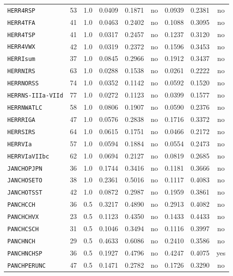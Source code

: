 \begin{landscape}
\begin{longtable}{@{}p{2.9cm}r r r r c r r c@{}}
\texttt{HERR4RSP} & 53 & 1.0 & 0.0409 & 0.1871 & no & 0.0939 & 0.2381 & no \\
\texttt{HERR4TFA} & 41 & 1.0 & 0.0463 & 0.2402 & no & 0.1088 & 0.3095 & no \\
\texttt{HERR4TSP} & 41 & 1.0 & 0.0317 & 0.2457 & no & 0.1237 & 0.3120 & no \\
\texttt{HERR4VWX} & 42 & 1.0 & 0.0319 & 0.2372 & no & 0.1596 & 0.3453 & no \\
\texttt{HERRIsum} & 37 & 1.0 & 0.0845 & 0.2966 & no & 0.1912 & 0.3437 & no \\
\texttt{HERRNIRS} & 63 & 1.0 & 0.0288 & 0.1538 & no & 0.0261 & 0.2222 & no \\
\texttt{HERRNORSS} & 74 & 1.0 & 0.0352 & 0.1142 & no & 0.0592 & 0.1520 & no \\
\texttt{HERRNS-IIIa-VIId} & 77 & 1.0 & 0.0272 & 0.1123 & no & 0.0399 & 0.1577 & no \\
\texttt{HERRNWATLC} & 58 & 1.0 & 0.0806 & 0.1907 & no & 0.0590 & 0.2376 & no \\
\texttt{HERRRIGA} & 47 & 1.0 & 0.0576 & 0.2838 & no & 0.1716 & 0.3372 & no \\
\texttt{HERRSIRS} & 64 & 1.0 & 0.0615 & 0.1751 & no & 0.0466 & 0.2172 & no \\
\texttt{HERRVIa} & 57 & 1.0 & 0.0594 & 0.1884 & no & 0.0554 & 0.2473 & no \\
\texttt{HERRVIaVIIbc} & 62 & 1.0 & 0.0694 & 0.2127 & no & 0.0819 & 0.2685 & no \\
\texttt{JANCHOPJPN} & 36 & 1.0 & 0.1744 & 0.3416 & no & 0.1181 & 0.3666 & no \\
\texttt{JANCHOSETO} & 38 & 1.0 & 0.2361 & 0.5016 & no & 0.1117 & 0.4083 & no \\
\texttt{JANCHOTSST} & 42 & 1.0 & 0.0872 & 0.2987 & no & 0.1959 & 0.3861 & no \\
\texttt{PANCHCCH} & 36 & 0.5 & 0.3217 & 0.4890 & no & 0.2913 & 0.4082 & no \\
\texttt{PANCHCHVX} & 23 & 0.5 & 0.1123 & 0.4350 & no & 0.1433 & 0.4433 & no \\
\texttt{PANCHCSCH} & 31 & 0.5 & 0.1046 & 0.3494 & no & 0.1116 & 0.3997 & no \\
\texttt{PANCHNCH} & 29 & 0.5 & 0.4633 & 0.6086 & no & 0.2410 & 0.3586 & no \\
\texttt{PANCHNCHSP} & 36 & 0.5 & 0.1927 & 0.4796 & no & 0.4247 & 0.4075 & yes \\
\texttt{PANCHPERUNC} & 47 & 0.5 & 0.1471 & 0.2782 & no & 0.1726 & 0.3290 & no \\

\end{longtable}
\end{landscape}
